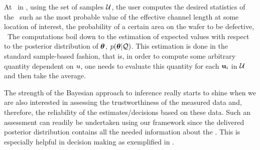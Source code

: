 At \ in , using the set of samples $\mathcal{U}$, the user computes the desired statistics of the \qoi\ such as the most probable value of the effective channel length at some location of interest, the probability of a certain area on the wafer to be defective, \etc\ The computations boil down to the estimation of expected values with respect to the posterior distribution of ${\boldsymbol\theta}$, $\f{\vparam | \QData}$.
This estimation is done in the standard sample-based fashion, that is, in order to compute some arbitrary quantity dependent on $u$, one needs to evaluate this quantity for each $\mathbf{u}_i$ in $\mathcal{U}$ and then take the average.

The strength of the Bayesian approach to inference really starts to shine when we are also interested in assessing the trustworthiness of the measured data and, therefore, the reliability of the estimates/decisions based on these data.
Such an assessment can readily be undertaken using our framework since the delivered posterior distribution contains all the needed information about the \qoi.
This is especially helpful in decision making as exemplified in .
